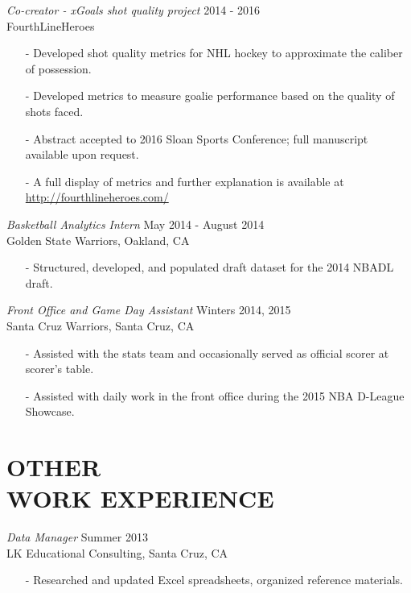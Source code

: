 \documentclass[margin]{res}
\begin{document}
\begin{resume}
\textit{Co-creator - xGoals shot quality project} \hfill 2014 - 2016
\\ FourthLineHeroes
\begin{itemize}
\item[-] Developed shot quality metrics for NHL hockey to approximate the caliber of possession.
\vspace{-3pt}\item[-] Developed metrics to measure goalie performance based on the quality of shots faced.
\vspace{-3pt}\item[-] Abstract accepted to 2016 Sloan Sports Conference; full manuscript available upon request.
\vspace{-13pt}\item[-] A full display of metrics and further explanation is available at \href{http://fourthlineheroes.com/}{http://fourthlineheroes.com/}
\end{itemize}

\textit{Basketball Analytics Intern} \hfill May 2014 - August 2014
\\Golden State Warriors, Oakland, CA
\begin{itemize}
\item[-] Structured, developed, and populated draft dataset for the 2014 NBADL draft.
\end{itemize}

\textit{Front Office and Game Day Assistant} \hfill Winters 2014, 2015
\\Santa Cruz Warriors, Santa Cruz, CA 
\begin{itemize}
\item[-] Assisted with the stats team and occasionally served as official scorer at scorer’s table.
\vspace{-3pt}\item[-] Assisted with daily work in the front office during the 2015 NBA D-League Showcase.
\end{itemize}


\section{OTHER \\WORK EXPERIENCE}
\vspace{0pt}
\textit{Data Manager} \hfill Summer 2013
\\LK Educational Consulting, Santa Cruz, CA 
\begin{itemize}
\item[-] Researched and updated Excel spreadsheets, organized reference materials.
\end{itemize}


\end{resume}
\end{document}
